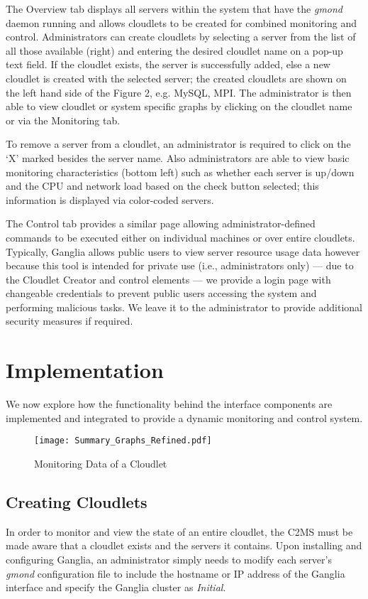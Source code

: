 \documentclass[10pt, conference, compsocconf]{IEEEtran}
\begin{document}
The Overview tab displays all servers within the system that have the \textit{gmond} daemon running and allows cloudlets to be created for combined monitoring and control. Administrators can create cloudlets by selecting a server from the list of all those available (right) and entering the desired cloudlet name on a pop-up text field. If the cloudlet exists, the server is successfully added, else a new cloudlet is created with the selected server; the created cloudlets are shown on the left hand side of the Figure 2, e.g. MySQL, MPI. The administrator is then able to view cloudlet or system specific graphs by clicking on the cloudlet name or via the Monitoring tab. 

To remove a server from a cloudlet, an administrator is required to click on the `X' marked besides the server name. Also administrators are able to view basic monitoring characteristics (bottom left) such as whether each server is up/down and the CPU and network load based on the check button selected; this information is displayed via color-coded servers. 

The Control tab provides a similar page allowing administrator-defined commands to be executed either on individual machines or over entire cloudlets. Typically, Ganglia allows public users to view server resource usage data however because this tool is intended for private use (i.e., administrators only) --- due to the Cloudlet Creator and control elements --- we provide a login page with changeable credentials to prevent public users accessing the system and performing malicious tasks. We leave it to the administrator to provide additional security measures if required.
 
\section{Implementation}
We now explore how the functionality behind the interface components are implemented and integrated to provide a dynamic monitoring and control system.

\begin{figure*}[ht]
  \begin{center}
\texttt{[image: Summary\_Graphs\_Refined.pdf]}
  \end{center}
 \caption{Monitoring Data of a Cloudlet}
\end{figure*}

\subsection{Creating Cloudlets}
In order to monitor and view the state of an entire cloudlet, the C2MS must be made aware that a cloudlet exists and the servers it contains. Upon installing and configuring Ganglia, an administrator simply needs to modify each server's \textit{gmond} configuration file to include the hostname or IP address of the Ganglia interface and specify the Ganglia cluster as \textit{Initial}. 
\end{document}
